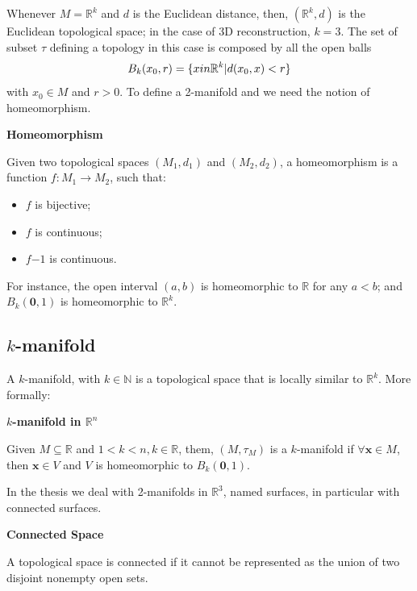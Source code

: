 Whenever $M = \mathbb{R}^k$ and $d$ is the Euclidean distance, then, $(\mathbb{R}^k, d)$ is the Euclidean topological space; in the case of 3D reconstruction, $k=3$.
The set of subset $\tau$ defining a topology in this case is composed by all the open balls
\[
B_k(x_0, r) = \{x \\in \mathbb{R}^k | d(x_0, x) < r\}
\]
with $x_0 \in M$ and $r > 0$.
To define a 2-manifold and we need the notion of homeomorphism.

\begin{mydef}
   \textbf{Homeomorphism}
   
   Given two topological spaces $(M_1, d_1)$ and $(M_2, d_2)$, a homeomorphism is a function $f:M_1\longrightarrow M_2$, such that:
   \begin{itemize}
    \item $f$ is bijective;
    \item $f$ is continuous;
    \item $f{-1}$ is continuous.
   \end{itemize}
\end{mydef}

For instance, the open interval $(a, b)$ is homeomorphic to $\mathbb{R}$ for any $a < b$; and $B_k(\mathbf{0}, 1)$ is homeomorphic to $\mathbb{R}^k$. 

\subsection{$k$-manifold}
A $k$-manifold, with $k \in \mathbb{N}$ is a topological space that is locally similar to $\mathbb{R}^k$. More formally:

\begin{mydef}
 \textbf{$k$-manifold in $\mathbb{R}^n$}
 
 Given $M \subseteq \mathbb{R}$ and $1 < k < n, k \in \mathbb{R}$, them, $(M, \tau_M)$ is a $k$-manifold if $\forall \mathbf{x} \in M$, then $\mathbf{x} \in V$ and $V$ is homeomorphic to $B_k(\mathbf{0}, 1)$.
\end{mydef}

In the thesis we deal with 2-manifolds in $\mathbb{R}^3$, named surfaces, in particular with connected surfaces. 

\begin{mydef}
\textbf{Connected Space}

A topological space is connected if it cannot be represented as the union of two disjoint nonempty open sets. 
\end{mydef}

